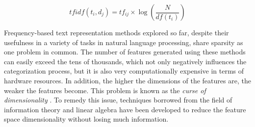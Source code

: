 $$t f i d f \left( t _ { i } , d _ { j } \right) = t f _ { i j } \times \log \left( \frac { N } { d f \left( t _ { i } \right) } \right)$$

Frequency-based text representation methods explored so far, despite their usefulness in a variety of tasks in natural language processing, share sparsity as one problem in common. The number of features generated using these methods can easily exceed the tens of thousands, which not only negatively influences the categorization process, but it is also very computationally expensive in terms of hardware resources. In addition, the higher the dimensions of the features are, the weaker the features become. This problem is known as the \emph{curse of dimensionality} \citep{bellman2015adaptive}. To remedy this issue,  techniques borrowed from the field of information theory and linear algebra have been developed to reduce the feature space dimensionality without losing much information. 


